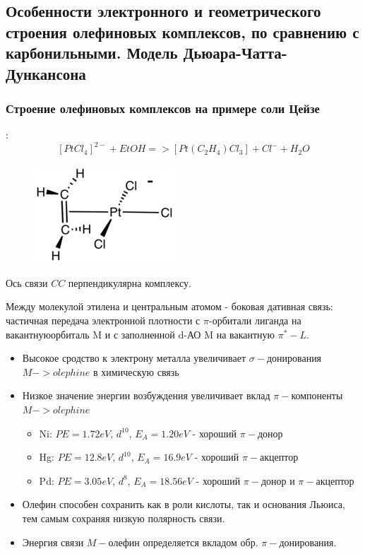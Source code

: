 \subsection{Особенности электронного и геометрического строения олефиновых комплексов, по сравнению с карбонильными. Модель Дьюара-Чатта-Дункансона}

\subsubsection*{Строение олефиновых комплексов на примере соли Цейзе}: 
$$[PtCl_4]^{2-} + EtOH => [Pt(C_2H_4)Cl_3] + Cl^- + H_2O$$

\begin{figure}[htp]
\centering
\includegraphics[scale=1.00]{images/ceise.png}
\end{figure}

Ось связи $CC$ перпендикулярна комплексу.

Между молекулой этилена и центральным атомом - боковая дативная связь: частичная передача электронной плотности с $\pi$-орбитали лиганда на вакантнуюорбиталь M и с заполненной d-АО M на вакантную $\pi^*-L$.

\begin{itemize}
	\item Высокое сродство к электрону металла увеличивает $\sigma-$донирования $M->olephine$ 	в химическую связь
	\item Низкое значение энергии возбуждения увеличивает вклад $\pi-$компоненты $M->olephine$
	\begin{itemize}
		\item Ni: $PE=1.72eV$, $d^{10}$, $E_A = 1.20eV$ - хороший $\pi-$донор
		\item Hg: $PE=12.8eV$, $d^{10}$, $E_A = 16.9eV$ - 	хороший $\pi-$акцептор
		\item Pd: $PE=3.05eV$, $d^{8}$, $E_A = 18.56eV$ - хороший $\pi-$донор и $\pi-$акцептор
	\end{itemize}
	\item Олефин способен сохранить как в роли кислоты, так и основания Льюиса, тем самым сохраняя низкую полярность связи.
	\item Энергия связи $M-$олефин определяется вкладом обр. $\pi-$донирования.
\end{itemize}

